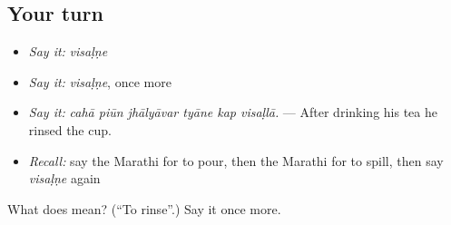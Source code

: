\subsection*{Your turn}
\begin{itemize}
\raggedright
  \item \emph{Say it:} \emph{visaḷṇe}
  \item \emph{Say it:} \emph{visaḷṇe}, once more
  \item \emph{Say it:} \emph{cahā piūn jhālyāvar tyāne kap visaḷlā.} — After drinking his tea he rinsed the cup.
  \item \emph{Recall:} say the Marathi for to pour, then the Marathi for to spill, then say \emph{visaḷṇe} again
\end{itemize}

\begin{tcolorbox}[breakable,colback=teal!4,colframe=teal!35!black,title={Before you move on}]
What does  mean? (\textquotedblleft{}To rinse\textquotedblright{}.) Say it once more.
\end{tcolorbox}
